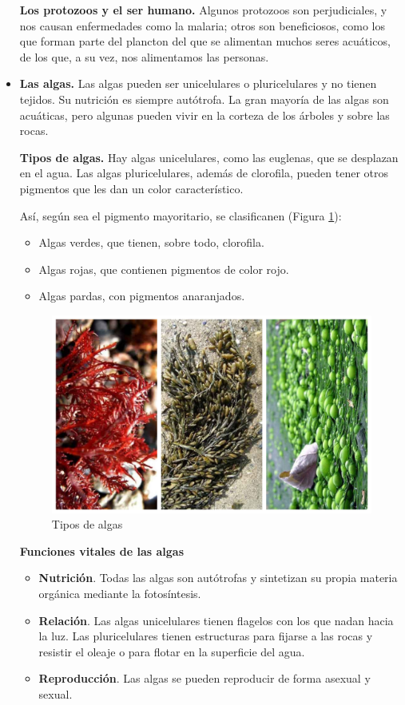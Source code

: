 \begin{itemize}
    \textbf{Los protozoos y el ser humano.} Algunos protozoos son perjudiciales, y nos causan enfermedades como la malaria; otros son beneficiosos, como los que forman parte del plancton del que se alimentan muchos seres acuáticos, de los que, a su vez, nos alimentamos las personas.
    
    \item \textbf{Las algas.} Las algas pueden ser unicelulares o pluricelulares y no tienen tejidos. Su nutrición es siempre autótrofa. La gran mayoría de las algas son acuáticas, pero algunas pueden vivir en la corteza de los árboles y sobre las rocas.

    \textbf{Tipos de algas.} Hay algas unicelulares, como las euglenas, que se desplazan en el agua. Las algas pluricelulares, además de clorofila, pueden tener otros pigmentos que les dan un color característico.

    Así, según sea el pigmento mayoritario, se clasificanen (Figura \ref{fig:tipos-algas}):
    \begin{itemize}
        \item Algas verdes, que tienen, sobre todo, clorofila.
        \item Algas rojas, que contienen pigmentos de color rojo.
        \item Algas pardas, con pigmentos anaranjados.
    \end{itemize}

    \begin{figure}[!ht]
        \centering
        \includegraphics[width=0.65\linewidth]{Tema1/11_Tipos_algas.jpg}
        \caption{Tipos de algas}
        \label{fig:tipos-algas}
    \end{figure}

    \textbf{Funciones vitales de las algas}
    \begin{itemize}
        \item \textbf{Nutrición}. Todas las algas son autótrofas y sintetizan su propia materia orgánica mediante la fotosíntesis.
        \item \textbf{Relación}. Las algas unicelulares tienen flagelos con los que nadan hacia la luz. Las pluricelulares tienen estructuras para fijarse a las rocas y resistir el oleaje o para flotar en la superficie del agua.
        \item \textbf{Reproducción}. Las algas se pueden reproducir de forma asexual y sexual.
    \end{itemize}


\end{itemize}
